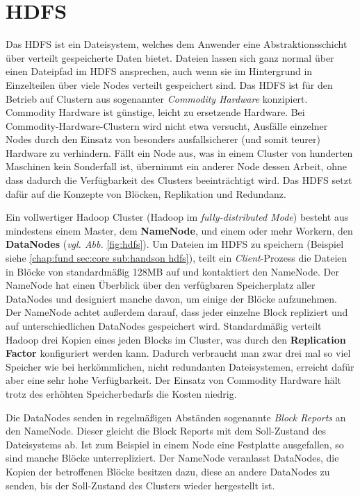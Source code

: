\section{HDFS}
\label{chap:fund sec:core sub:hdfs}
Das HDFS ist ein Dateisystem, welches dem Anwender eine Abstraktionsschicht über verteilt gespeicherte Daten bietet. Dateien lassen sich ganz normal über einen Dateipfad im HDFS ansprechen, auch wenn sie im Hintergrund in Einzelteilen über viele Nodes verteilt gespeichert sind. Das HDFS ist für den Betrieb auf Clustern aus sogenannter \textit{Commodity Hardware} konzipiert. Commodity Hardware ist günstige, leicht zu ersetzende Hardware. Bei Commodity-Hardware-Clustern wird nicht etwa versucht, Ausfälle einzelner Nodes durch den Einsatz von besonders ausfallsicherer (und somit teurer) Hardware zu verhindern. Fällt ein Node aus, was in einem Cluster von hunderten Maschinen kein Sonderfall ist, übernimmt ein anderer Node dessen Arbeit, ohne dass dadurch die Verfügbarkeit des Clusters beeinträchtigt wird. Das HDFS setzt dafür auf die Konzepte von Blöcken, Replikation und Redundanz.\cite{white_hadoop_2015}  
\par
Ein vollwertiger Hadoop Cluster (Hadoop im \textit{fully-distributed Mode}) besteht aus mindestens einem Master, dem \textbf{NameNode}, und einem oder mehr Workern, den \textbf{DataNodes} (\textit{vgl. Abb. }\ref{fig:hdfs}). Um Dateien im HDFS zu speichern (Beispiel siehe \ref{chap:fund sec:core sub:handson hdfs}), teilt ein \textit{Client}-Prozess die Dateien in Blöcke von standardmäßig 128MB auf und kontaktiert den NameNode. Der NameNode hat einen Überblick über den verfügbaren Speicherplatz aller DataNodes und designiert manche davon, um einige der Blöcke aufzunehmen. Der NameNode achtet außerdem darauf, dass jeder einzelne Block repliziert und auf unterschiedlichen DataNodes gespeichert wird. Standardmäßig verteilt Hadoop drei Kopien eines jeden Blocks im Cluster, was durch den \textbf{Replication Factor} konfiguriert werden kann. Dadurch verbraucht man zwar drei mal so viel Speicher wie bei herkömmlichen, nicht redundanten Dateisystemen, erreicht dafür aber eine sehr hohe Verfügbarkeit. Der Einsatz von Commodity Hardware hält trotz des erhöhten Speicherbedarfs die Kosten niedrig.\cite{white_hadoop_2015}     
\par
Die DataNodes senden in regelmäßigen Abständen sogenannte \textit{Block Reports} an den NameNode. Dieser gleicht die Block Reports mit dem Soll-Zustand des Dateisystems ab. Ist zum Beispiel in einem Node eine Festplatte ausgefallen, so sind manche Blöcke unterrepliziert. Der NameNode veranlasst DataNodes, die Kopien der betroffenen Blöcke besitzen dazu, diese an andere DataNodes zu senden, bis der Soll-Zustand des Clusters wieder hergestellt ist.

